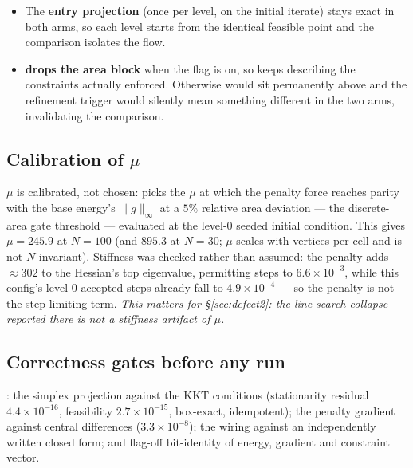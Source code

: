 \documentclass[11pt,a4paper]{article}
\begin{document}
\begin{itemize}
  \item The \textbf{entry projection} (once per level, on the initial iterate)
    stays exact in both arms, so each level starts from the identical feasible
    point and the comparison isolates the flow.
  \item {} \textbf{drops the area block} when the flag is on,
    so  keeps describing the constraints actually enforced. Otherwise
     would sit permanently above  and
    the refinement trigger would silently mean something different in the two
    arms, invalidating the comparison.
\end{itemize}

\subsection{Calibration of \texorpdfstring{\(\mu\)}{mu}}

\(\mu\) is calibrated, not chosen: 
picks the \(\mu\) at which the penalty force reaches parity with the base
energy's \(\|g\|_\infty\) at a \(5\%\) relative area deviation --- the
discrete-area gate threshold --- evaluated at the level-0 seeded initial
condition. This gives \(\mu = 245.9\) at \(N{=}100\) (and \(895.3\) at
\(N{=}30\); \(\mu\) scales with vertices-per-cell and is not \(N\)-invariant).
Stiffness was checked rather than assumed: the penalty adds \(\approx 302\) to
the Hessian's top eigenvalue, permitting steps to \(6.6\times10^{-3}\), while
this config's level-0 accepted steps already fall to \(4.9\times10^{-4}\) --- so
the penalty is not the step-limiting term. \emph{This matters for
\S\ref{sec:defect2}: the line-search collapse reported there is not a stiffness
artifact of \(\mu\).}

\subsection{Correctness gates before any run}

: the simplex projection
against the KKT conditions (stationarity residual \(4.4\times10^{-16}\),
feasibility \(2.7\times10^{-15}\), box-exact, idempotent); the penalty gradient
against central differences (\(3.3\times10^{-8}\)); the wiring against an
independently written closed form; and flag-off bit-identity of energy, gradient
and constraint vector.
\end{document}

